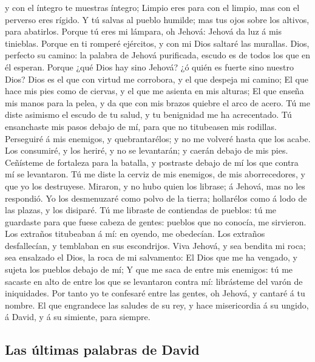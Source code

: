 y con el íntegro te muestras íntegro;  Limpio eres para
con el limpio, mas con el perverso eres rígido.  Y tú
salvas al pueblo humilde; mas tus ojos sobre los altivos, para
abatirlos.  Porque tú eres mi lámpara, oh Jehová: Jehová
da luz á mis tinieblas.  Porque en ti romperé ejércitos,
y con mi Dios saltaré las murallas.  Dios, perfecto su
camino: la palabra de Jehová purificada, escudo es de todos los que en
él esperan.  Porque ¿qué Dios hay sino Jehová? ¿ó quién
es fuerte sino nuestro Dios?  Dios es el que con virtud
me corrobora, y el que despeja mi camino;  El que hace
mis pies como de ciervas, y el que me asienta en mis alturas;
 El que enseña mis manos para la pelea, y da que con mis
brazos quiebre el arco de acero.  Tú me diste asimismo el
escudo de tu salud, y tu benignidad me ha acrecentado. 
Tú ensanchaste mis pasos debajo de mí, para que no titubeasen mis
rodillas.  Perseguiré á mis enemigos, y quebrantarélos; y
no me volveré hasta que los acabe.  Los consumiré, y los
heriré, y no se levantarán; y caerán debajo de mis pies. 
Ceñísteme de fortaleza para la batalla, y postraste debajo de mí los que
contra mí se levantaron.  Tú me diste la cerviz de mis
enemigos, de mis aborrecedores, y que yo los destruyese. 
Miraron, y no hubo quien los librase; á Jehová, mas no les respondió.
 Yo los desmenuzaré como polvo de la tierra; hollarélos
como á lodo de las plazas, y los disiparé.  Tú me
libraste de contiendas de pueblos: tú me guardaste para que fuese cabeza
de gentes: pueblos que no conocía, me sirvieron.  Los
extraños titubeaban á mí: en oyendo, me obedecían.  Los
extraños desfallecían, y temblaban en sus escondrijos. 
Viva Jehová, y sea bendita mi roca; sea ensalzado el Dios, la roca de mi
salvamento:  El Dios que me ha vengado, y sujeta los
pueblos debajo de mí;  Y que me saca de entre mis
enemigos: tú me sacaste en alto de entre los que se levantaron contra
mí: librásteme del varón de iniquidades.  Por tanto yo te
confesaré entre las gentes, oh Jehová, y cantaré á tu nombre.
 El que engrandece las saludes de su rey, y hace
misericordia á su ungido, á David, y á su simiente, para siempre.

\hypertarget{las-uxfaltimas-palabras-de-david}{%
\subsection{Las últimas palabras de
David}\label{las-uxfaltimas-palabras-de-david}}

